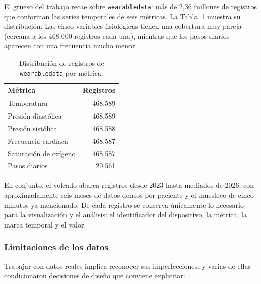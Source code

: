 \documentclass[12pt,a4paper]{article}
\begin{document}
    El grueso del trabajo recae sobre \texttt{wearabledata}: más de 2,36 millones de registros que conforman las series temporales de seis métricas. La Tabla~\ref{tab:metricas} muestra su distribución. Las cinco variables fisiológicas tienen una cobertura muy pareja (cercana a los 468.000 registros cada una), mientras que los pasos diarios aparecen con una frecuencia mucho menor.

    \begin{table}[h]
        \centering
        \begin{tabular}{l r}
            \hline
            \textbf{Métrica} & \textbf{Registros} \\
            \hline
            Temperatura & 468.589 \\
            Presión diastólica & 468.589 \\
            Presión sistólica & 468.588 \\
            Frecuencia cardíaca & 468.587 \\
            Saturación de oxígeno & 468.587 \\
            Pasos diarios & 20.561 \\
            \hline
        \end{tabular}
        \caption{Distribución de registros de \texttt{wearabledata} por métrica.}
        \label{tab:metricas}
    \end{table}

    En conjunto, el volcado abarca registros desde 2023 hasta mediados de 2026, con aproximadamente seis meses de datos densos por paciente y el muestreo de cinco minutos ya mencionado. De cada registro se conserva únicamente lo necesario para la visualización y el análisis: el identificador del dispositivo, la métrica, la marca temporal y el valor.

    \subsubsection{Limitaciones de los datos}
    Trabajar con datos reales implica reconocer sus imperfecciones, y varias de ellas condicionaron decisiones de diseño que conviene explicitar:
\end{document}
